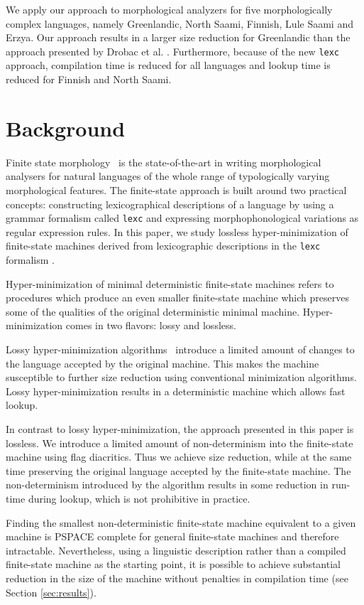 \documentclass[11pt]{article}
\begin{document}
We apply our approach to morphological analyzers for five
morphologically complex languages, namely Greenlandic, North Saami,
Finnish, Lule Saami and Erzya. Our approach results in a larger size
reduction for Greenlandic than the approach presented by Drobac et
al. . Furthermore, because of the new \texttt{lexc} approach, compilation time is reduced
for all languages and lookup time is reduced for Finnish and North
Saami.


\section{Background}
\label{sec:background}

Finite state morphology~\cite{beesley2003finite} is the
state-of-the-art in writing morphological analysers for natural
languages of the whole range of typologically varying morphological
features. The finite-state approach is built around two practical
concepts: constructing lexicographical descriptions of a language
by using a grammar formalism called \texttt{lexc} and expressing morphophonological
variations as regular expression rules. In this paper, we study lossless
hyper-minimization of finite-state machines derived from lexicographic
descriptions in the \texttt{lexc} formalism \cite{beesley1998constraining}.

Hyper-minimization of minimal deterministic finite-state machines
refers to procedures which produce an even smaller finite-state
machine which preserves some of the qualities of the original
deterministic minimal machine. Hyper-minimization comes in two flavors:
lossy and lossless.

Lossy hyper-minimization algorithms~\cite{maletti2011} introduce a
limited amount of changes to the language accepted by the original
machine. This makes the machine susceptible to further size reduction
using conventional minimization algorithms. Lossy hyper-minimization results in a deterministic machine which allows fast lookup.

In contrast to lossy hyper-minimization, the approach presented in
this paper is lossless. We introduce a limited amount of
non-determinism into the finite-state machine using flag
diacritics. Thus we achieve size reduction, while at the same time
preserving the original language accepted by the finite-state
machine. The non-determinism introduced by the algorithm results in
some reduction in run-time during lookup, which is not prohibitive in practice.

Finding the smallest non-deterministic finite-state machine equivalent
to a given machine is PSPACE complete \cite{jiang1993} for general
finite-state machines and therefore intractable. Nevertheless, using a
linguistic description rather than a compiled finite-state machine
as the starting point, it is possible to achieve substantial reduction in
the size of the machine without penalties in compilation time (see
Section \ref{sec:results}).
\end{document}
